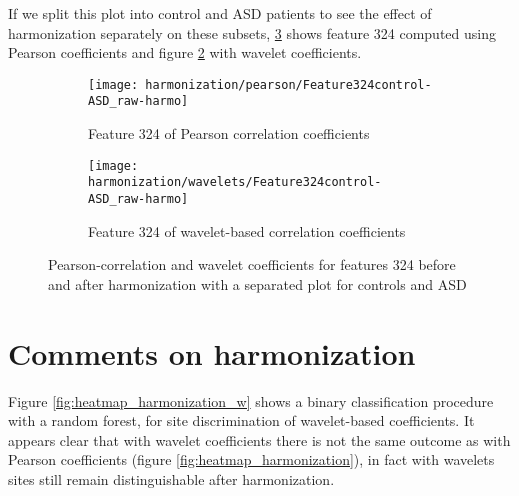 \documentclass[11pt]{report}
\begin{document}
 If we split this plot into control and ASD patients to see the effect of harmonization separately on these subsets, \ref{fig:features_control-ASD_raw-harmo} shows feature 324 computed using Pearson coefficients and figure \ref{fig:feature324-control-ASD_w} with wavelet coefficients.

 \begin{figure}
 \centering
 \begin{subfigure}[b]{1.\textwidth}
    \texttt{[image: harmonization/pearson/Feature324control-ASD\_raw-harmo]}
    \caption{Feature 324 of Pearson correlation coefficients}
    \label{fig:feature324-control-ASD}
 \end{subfigure}
 \begin{subfigure}[b]{1.\textwidth}
    \texttt{[image: harmonization/wavelets/Feature324control-ASD\_raw-harmo]}
    \caption{Feature 324 of wavelet-based correlation coefficients}
    \label{fig:feature324-control-ASD_w}
 \end{subfigure}
 \caption{Pearson-correlation and wavelet coefficients for features 324 before and after harmonization with a separated plot for controls and ASD}
 \label{fig:features_control-ASD_raw-harmo}
 \end{figure}




\section{Comments on harmonization}


Figure \ref{fig:heatmap_harmonization_w} shows a binary classification procedure with a random forest, for site discrimination of wavelet-based coefficients. It appears clear that with wavelet coefficients there is not the same outcome as with Pearson coefficients (figure \ref{fig:heatmap_harmonization}), in fact with wavelets sites still remain distinguishable after harmonization.
\end{document}
